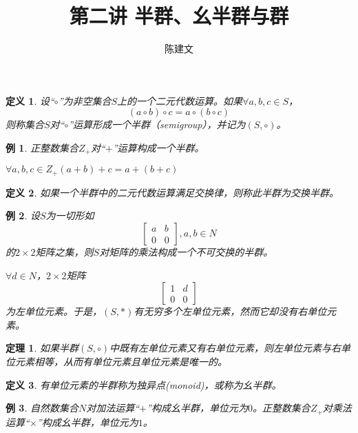 \documentclass{article}
\newtheorem{Def}{定义}
\newtheorem{Thm}{定理}
\newtheorem*{Example}{例}
\begin{document}
\begin{CJK*}{UTF8}{gbsn}
  \title{第二讲 半群、幺半群与群}
  \author{陈建文}
  \maketitle
  


\begin{Def}
设“$\circ$”为非空集合$S$上的一个二元代数运算。如果$\forall a,b,c \in S$，
\[(a\circ b) \circ c = a \circ (b\circ c)\]
则称集合$S$对“$\circ$”运算形成一个半群（semigroup），并记为$(S,\circ)$。  
\end{Def}

\begin{Example}
  正整数集合$Z_+$对“$+$”运算构成一个半群。
\end{Example}

$\forall a,b,c \in Z_+ (a+b)+c = a + (b + c)$

\begin{Def}
  如果一个半群中的二元代数运算满足交换律，则称此半群为交换半群。
\end{Def}

\begin{Example}
  设$S$为一切形如
  \[\begin{bmatrix}
    a&b\\
    0&0
  \end{bmatrix},a,b\in N\]
的$2\times 2$矩阵之集，则$S$对矩阵的乘法构成一个不可交换的半群。

$\forall d\in N$，$2\times 2$矩阵
\[\begin{bmatrix}1&d\\0&0\end{bmatrix}\]
为左单位元素。于是，$(S,*)$有无穷多个左单位元素，然而它却没有右单位元素。
\end{Example}

\begin{Thm}
  如果半群$(S,\circ)$中既有左单位元素又有右单位元素，则左单位元素与右单位元素相等，从而有单位元素且单位元素是唯一的。
\end{Thm}

\begin{Def}
  有单位元素的半群称为独异点(monoid)，或称为幺半群。
\end{Def}

\begin{Example}
  自然数集合$N$对加法运算“$+$”构成幺半群，单位元为$0$。正整数集合$Z_+$对乘法运算“$\times$”构成幺半群，单位元为$1$。
\end{Example}


\end{CJK*}
\end{document}
